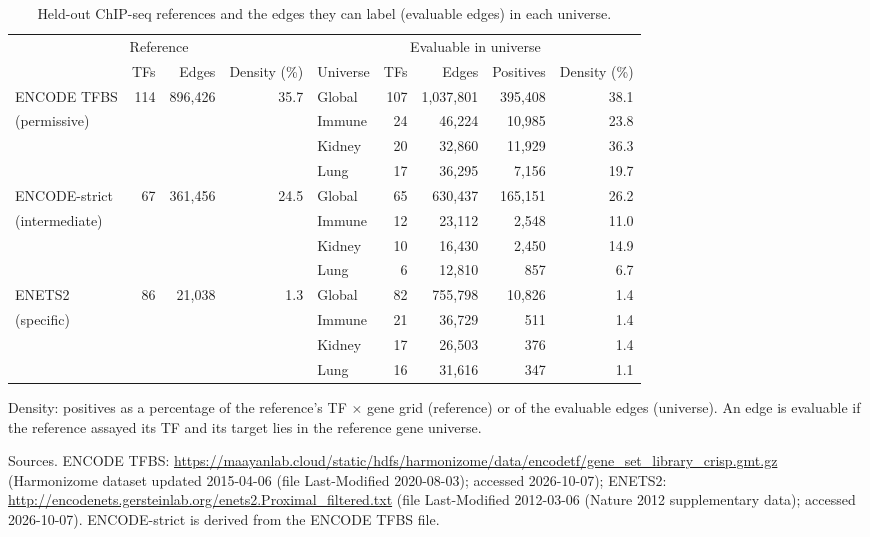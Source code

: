 \begin{table}[tbp]
\centering
\small
\setlength{\tabcolsep}{4pt}
\caption{Held-out ChIP-seq references and the edges they can label (evaluable edges) in each universe.}
\label{tab:chip}
\begin{tabular}{@{}lrrrlrrrr@{}}
\toprule
\multicolumn{4}{c}{Reference} & \multicolumn{5}{c}{Evaluable in universe} \\
\cmidrule(lr){1-4}\cmidrule(lr){5-9}
 & TFs & Edges & Density (\%) & Universe & TFs & Edges & Positives & Density (\%) \\
\midrule
ENCODE TFBS & 114 & 896{,}426 & 35.7 & Global & 107 & 1{,}037{,}801 & 395{,}408 & 38.1 \\
{\footnotesize (permissive)} &  &  &  & Immune & 24 & 46{,}224 & 10{,}985 & 23.8 \\
 &  &  &  & Kidney & 20 & 32{,}860 & 11{,}929 & 36.3 \\
 &  &  &  & Lung & 17 & 36{,}295 & 7{,}156 & 19.7 \\
\addlinespace[2pt]
ENCODE-strict & 67 & 361{,}456 & 24.5 & Global & 65 & 630{,}437 & 165{,}151 & 26.2 \\
{\footnotesize (intermediate)} &  &  &  & Immune & 12 & 23{,}112 & 2{,}548 & 11.0 \\
 &  &  &  & Kidney & 10 & 16{,}430 & 2{,}450 & 14.9 \\
 &  &  &  & Lung & 6 & 12{,}810 & 857 & 6.7 \\
\addlinespace[2pt]
ENETS2 & 86 & 21{,}038 & 1.3 & Global & 82 & 755{,}798 & 10{,}826 & 1.4 \\
{\footnotesize (specific)} &  &  &  & Immune & 21 & 36{,}729 & 511 & 1.4 \\
 &  &  &  & Kidney & 17 & 26{,}503 & 376 & 1.4 \\
 &  &  &  & Lung & 16 & 31{,}616 & 347 & 1.1 \\
\bottomrule
\end{tabular}
\par\smallskip
\begin{minipage}{\linewidth}\footnotesize
Density: positives as a percentage of the reference's TF $\times$ gene grid (reference) or of the evaluable edges (universe). An edge is evaluable if the reference assayed its TF and its target lies in the reference gene universe.

Sources. ENCODE TFBS: \url{https://maayanlab.cloud/static/hdfs/harmonizome/data/encodetf/gene_set_library_crisp.gmt.gz} (Harmonizome dataset updated 2015-04-06 (file Last-Modified 2020-08-03); accessed 2026-10-07); ENETS2: \url{http://encodenets.gersteinlab.org/enets2.Proximal_filtered.txt} (file Last-Modified 2012-03-06 (Nature 2012 supplementary data); accessed 2026-10-07). ENCODE-strict is derived from the ENCODE TFBS file.
\end{minipage}
\end{table}
